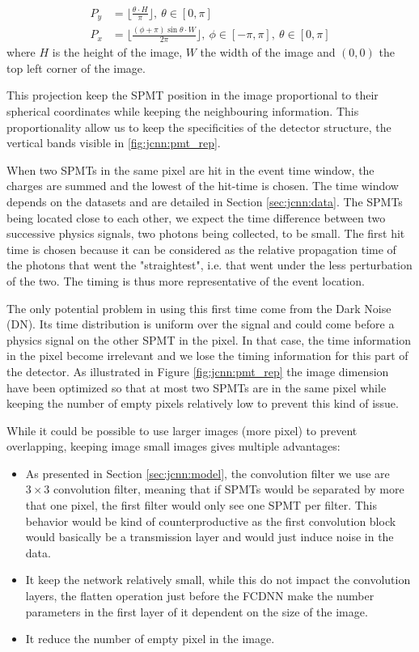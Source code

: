 \documentclass[../main.tex]{subfiles}
\begin{document}
\begin{align}
  P_y &= \bigg\lfloor \frac{\theta \cdot H}{\pi} \bigg\rfloor, ~ \theta \in [0, \pi] \\
  P_x &= \bigg\lfloor \frac{(\phi + \pi) \sin{\theta} \cdot W}{2\pi}\bigg\rfloor, ~ \phi \in [-\pi, \pi], ~ \theta \in [0, \pi]
\end{align}
where $H$ is the height of the image, $W$ the width of the image and $(0,0)$ the top left corner of the image.

This projection keep the SPMT position in the image proportional to their spherical coordinates while keeping the neighbouring information. This proportionality allow us to keep the specificities of the detector structure, the vertical bands visible in \ref{fig:jcnn:pmt_rep}.

When two SPMTs in the same pixel are hit in the event time window, the charges are summed and the lowest of the hit-time is chosen. The time window depends on the datasets and are detailed in Section \ref{sec:jcnn:data}. The SPMTs being located close to each other, we expect the time difference between two successive physics signals, two photons being collected, to be small. The first hit time is chosen because it can be considered as the relative propagation time of the photons that went the "straightest", i.e. that went under the less perturbation of the two. The timing is thus more representative of the event location.

The only potential problem in using this first time come from the Dark Noise (DN). Its time distribution is uniform over the signal and could come before a physics signal on the other SPMT in the pixel. In that case, the time information in the pixel become irrelevant and we lose the timing information for this part of the detector.
As illustrated in Figure \ref{fig:jcnn:pmt_rep} the image dimension have been optimized so that at most two SPMTs are in the same pixel while keeping the number of empty pixels relatively low to prevent this kind of issue.

While it could be possible to use larger images (more pixel) to prevent overlapping, keeping image small images gives multiple advantages:
\begin{itemize}
  \item As presented in Section \ref{sec:jcnn:model}, the convolution filter we use are $3 \times 3$ convolution filter, meaning that if SPMTs would be separated by more that one pixel, the first filter would only see one SPMT per filter. This behavior would be kind of counterproductive as the first convolution block would basically be a transmission layer and would just induce noise in the data.
  \item It keep the network relatively small, while this do not impact the convolution layers, the flatten operation just before the FCDNN make the number parameters in the first layer of it dependent on the size of the image.
  \item It reduce the number of empty pixel in the image.
\end{itemize}
\end{document}
